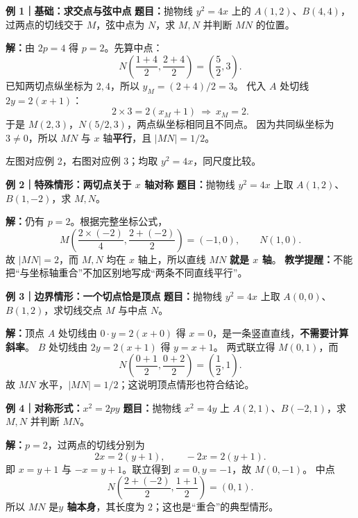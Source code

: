 \begin{examplebox}
\textbf{\textcolor{CExample}{例 1｜基础：求交点与弦中点}}
\textbf{题目：}抛物线 $y^2=4x$ 上的 $A(1,2)$、$B(4,4)$，过两点的切线交于 $M$，弦中点为 $N$，求 $M,N$ 并判断 $MN$ 的位置。

\textbf{解：}由 $2p=4$ 得 $p=2$。先算中点：
\[
N\left(\frac{1+4}{2},\frac{2+4}{2}\right)
 =\left(\frac52,3\right).
\]
已知两切点纵坐标为 $2,4$，所以 $y_M=(2+4)/2=3$。
代入 $A$ 处切线 $2y=2(x+1)$：
\[
2\times3=2(x_M+1)
\ \Longrightarrow\ x_M=2.
\]
于是 $M(2,3)$，$N(5/2,3)$，两点纵坐标相同且不同点。
因为共同纵坐标为 $3\ne0$，所以 $MN$ 与 $x$ 轴\textbf{平行}，且 $|MN|=1/2$。

\medskip
\par\noindent\begin{minipage}{\linewidth}
\begin{center}


左图对应例 2，右图对应例 3；均取 $y^2=4x$，同尺度比较。
\end{center}
\end{minipage}\par

\textbf{\textcolor{CExample}{例 2｜特殊情形：两切点关于 $x$ 轴对称}}
\textbf{题目：}抛物线 $y^2=4x$ 上取 $A(1,2)$、$B(1,-2)$，求 $M,N$。

\textbf{解：}仍有 $p=2$。根据完整坐标公式，
\[
M\left(\frac{2\times(-2)}{4},\frac{2+(-2)}2\right)=(-1,0),
\qquad N\left(1,0\right).
\]
故 $|MN|=2$，而 $M,N$ 均在 $x$ 轴上，所以直线 $MN$ \textbf{就是 $x$ 轴}。
\textbf{教学提醒：}不能把“与坐标轴重合”不加区别地写成“两条不同直线平行”。

\medskip
\textbf{\textcolor{CExample}{例 3｜边界情形：一个切点恰是顶点}}
\textbf{题目：}抛物线 $y^2=4x$ 上取 $A(0,0)$、$B(1,2)$，求切线交点 $M$ 与中点 $N$。

\textbf{解：}顶点 $A$ 处切线由 $0\cdot y=2(x+0)$ 得 $x=0$，是一条竖直直线，\textbf{不需要计算斜率}。
$B$ 处切线由 $2y=2(x+1)$ 得 $y=x+1$。
两式联立得 $M(0,1)$，而
\[
N\left(\frac{0+1}{2},\frac{0+2}{2}\right)
 =\left(\frac12,1\right).
\]
故 $MN$ 水平，$|MN|=1/2$；这说明顶点情形也符合结论。

\medskip
\textbf{\textcolor{CExample}{例 4｜对称形式：$x^2=2py$}}
\textbf{题目：}抛物线 $x^2=4y$ 上 $A(2,1)$、$B(-2,1)$，求 $M,N$ 并判断 $MN$。

\textbf{解：}$p=2$，过两点的切线分别为
\[
2x=2(y+1),\qquad -2x=2(y+1).
\]
即 $x=y+1$ 与 $-x=y+1$。联立得到 $x=0,y=-1$，故 $M(0,-1)$。
中点
\[
N\left(\frac{2+(-2)}2,\frac{1+1}2\right)=(0,1).
\]
所以 $MN$ 是\textbf{$y$ 轴本身}，其长度为 $2$；这也是“重合”的典型情形。


\end{examplebox}
